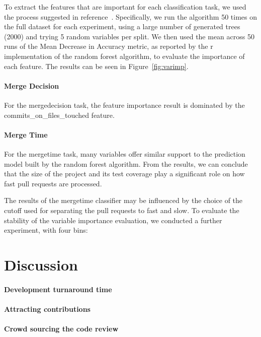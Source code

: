 \documentclass{sig-alternate}
\begin{document}
To extract the features that are important for each classification task, we
used the process suggested in reference~\cite{Genue10}. Specifically, we run
the algorithm 50 times on the full dataset for each experiment, using a large
number of generated trees (2000) and trying 5 random variables per split. We
then used the mean across 50 runs of the  Mean Decrease in Accuracy metric, as
reported by the {\sc r} implementation of the random forest algorithm, to
evaluate the importance of each feature. The results can be seen in
Figure~\ref{fig:varimp}.

\paragraph{Merge Decision}

For the \textsf{mergedecision} task, the feature importance result is dominated
by the \textsf{commits\_on\_files\_touched} feature. 

\paragraph{Merge Time}

For the \textsf{mergetime} task, many variables offer similar support to the
prediction model built by the random forest algorithm. From the results, we can
conclude that the size of the project and its test coverage play a significant
role on how fast pull requests are processed. 

The results of the \textsf{mergetime} classifier may be influenced by the choice of the cutoff used for separating the pull requests to fast and slow.
To evaluate the stability of the variable importance evaluation, we conducted
a further experiment, with four bins: 


\section{Discussion}
\label{sec:discussion}

\paragraph{Development turnaround time} 

\paragraph{Attracting contributions}

\paragraph{Crowd sourcing the code review}
\end{document}
